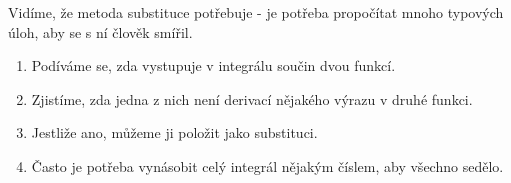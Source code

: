 Vidíme, že metoda substituce potřebuje  - je potřeba propočítat mnoho typových úloh, aby se s ní člověk smířil.

\begin{enumerate}
    \item Podíváme se, zda vystupuje v integrálu součin dvou funkcí.
    \item Zjistíme, zda jedna z nich není derivací nějakého výrazu v druhé funkci.
    \item Jestliže ano, můžeme ji položit jako substituci.
    \item Často je potřeba vynásobit celý integrál nějakým číslem, aby všechno sedělo.
\end{enumerate}